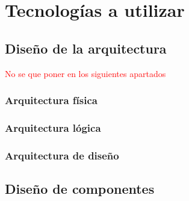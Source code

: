 \chapter{Tecnologías a utilizar}
\section{Diseño de la arquitectura}
\textcolor{red}{No se que poner en los siguientes apartados}
\subsection{Arquitectura física}


\subsection{Arquitectura lógica}


\subsection{Arquitectura de diseño}


\section{Diseño de componentes}
